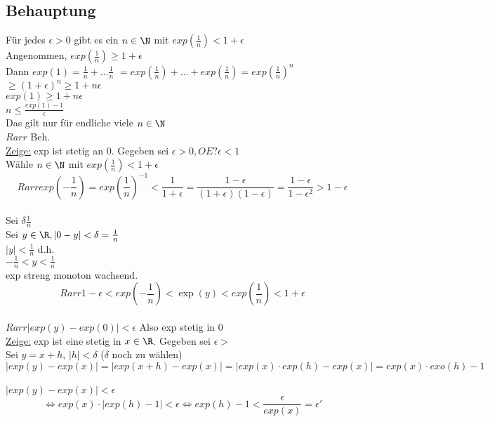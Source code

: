 \subsection*{Behauptung}
Für jedes $\epsilon > 0$ gibt es ein $n \in \N$ mit $exp(\frac{1}{n}) < 1 + \epsilon$\\
Angenommen, $exp(\frac{1}{n}) \geq 1 + \epsilon$\\
Dann $exp(1) = \frac{1}{n} + ... \frac{1}{n}$ %
\phantom{Dann $exp(1) $} $= exp(\frac{1}{n}) + ... + exp(\frac{1}{n}) = exp(\frac{1}{n})^n$ \\
\phantom{Dann $exp(1) $} $ \geq (1 + \epsilon)^n \geq 1 + n \epsilon $ %
\\
$exp(1) \geq 1 + n \epsilon$\\
$n \leq \frac{exp(1) - 1}{\epsilon}$\\
Das gilt nur für endliche viele $n \in \N$\\
$Rarr$ Beh.\\
\underline{Zeige:} exp ist stetig an 0. Gegeben sei $\epsilon > 0, OE ? \epsilon < 1$\\
Wähle $n \in \N$ mit $exp(\frac{1}{n}) < 1 + \epsilon$\\
$$Rarr exp(-\frac{1}{n}) = exp(\frac{1}{n})^{-1} < \frac{1}{1 + \epsilon} = \frac{1 - \epsilon}{(1+\epsilon)(1-\epsilon)} = \frac{1-\epsilon}{1 - \epsilon^2} > 1 - \epsilon$$\\
Sei $\delta \frac{1}{n}$\\
Sei $y \in \R, |0 - y| < \delta = \frac{1}{n}$\\
$|y| < \frac{1}{n}$ d.h.\\
$-\frac{1}{n} < y < \frac{1}{n}$\\
exp streng monoton wachsend.\\
$$Rarr 1 - \epsilon < exp(-\frac{1}{n}) < \exp(y) < exp(\frac{1}{n}) < 1 + \epsilon$$\\
$Rarr |exp(y) - exp(0)| < \epsilon$ Also exp stetig in 0\\
\underline{Zeige:} exp ist eine stetig in $x \in \R$. Gegeben sei $\epsilon > $\\
Sei $y = x + h$, $|h| < \delta$ ($\delta$ noch zu wählen)
$$|exp(y) - exp(x)| = |exp(x + h) - exp(x)| = |exp(x) \cdot exp(h) - exp(x)| = exp(x) \cdot exo(h) -1$$\\
$|exp(y) -exp(x) | < \epsilon$\\
$$\Leftrightarrow exp(x) \cdot |exp(h) - 1| < \epsilon \Leftrightarrow exp(h) - 1 < \frac{\epsilon}{exp(x)} = \epsilon '$$\\
